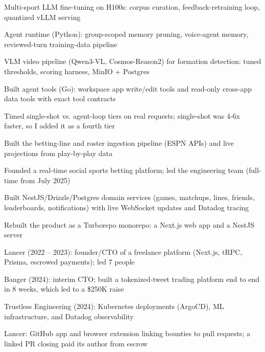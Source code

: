 \documentclass[print]{jack-resume}
\begin{document}
\begin{tightemize}
    \item Multi-sport LLM fine-tuning on H100s: corpus curation, feedback-retraining loop, quantized vLLM serving
    \item Agent runtime (Python): group-scoped memory pruning, voice-agent memory, reviewed-turn training-data pipeline
    \item VLM video pipeline (Qwen3-VL, Cosmos-Reason2) for formation detection: tuned thresholds, scoring harness, MinIO + Postgres
    \item Built agent tools (Go): workspace app write/edit tools and read-only cross-app data tools with exact tool contracts
    \item Timed single-shot vs. agent-loop tiers on real requests; single-shot was 4-6x faster, so I added it as a fourth tier
\end{tightemize}
\sectionsep

\begin{tightemize}
    \item Built the betting-line and roster ingestion pipeline (ESPN APIs) and live projections from play-by-play data
    \item Founded a real-time social sports betting platform; led the engineering team (full-time from July 2025)
    \item Built NestJS/Drizzle/Postgres domain services (games, matchups, lines, friends, leaderboards, notifications) with live WebSocket updates and Datadog tracing
    \item Rebuilt the product as a Turborepo monorepo: a Next.js web app and a NestJS server
\end{tightemize}
\sectionsep

\begin{tightemize}
    \item Lancer (2022 -- 2023): founder/CTO of a freelance platform (Next.js, tRPC, Prisma, escrowed payments); led 7 people
    \item Banger (2024): interim CTO; built a tokenized-tweet trading platform end to end in 8 weeks, which led to a \$250K raise
    \item Trustless Engineering (2024): Kubernetes deployments (ArgoCD), ML infrastructure, and Datadog observability
    \item Lancer: GitHub app and browser extension linking bounties to pull requests; a linked PR closing paid its author from escrow
\end{tightemize}
\sectionsep
\end{document}
